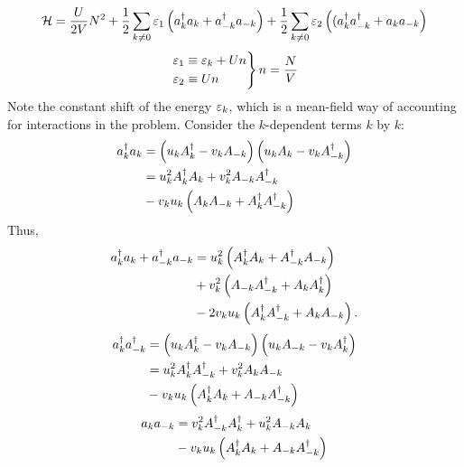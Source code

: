 \begin{equation}
	\label{eq:bose_hubbard_hamiltonian_mft}
	\mathcal{H} = \frac{U}{2V}N^2 + \frac{1}{2}\sum_{k\ne0}\varepsilon_1\left (a_{k}^{\dagger}a_{k} + a_{-k}^{\dagger}a_{-k}\right ) + \frac{1}{2}\sum_{k\ne0}\varepsilon_{2}\left ((a_{k}^{\dagger}a_{-k}^{\dagger} + a_{k}a_{-k}\right )
\end{equation}
\begin{equation}
	\begin{rcases}
		\varepsilon_1 \equiv \varepsilon_k + Un \\
		\varepsilon_2 \equiv Un
	\end{rcases}
	n = \frac{N}{V}
\end{equation}
Note the constant shift of the energy $\varepsilon_k$, which is a mean-field way of accounting for interactions in the problem. 
Consider the $k$-dependent terms $k$ by $k$:
\begin{equation}
	\begin{aligned}
		a_{k}^{\dagger}a_{k} &= \left (u_kA_k^{\dagger}-v_kA_{-k}\right )\left (u_kA_k-v_kA_{-k}^{\dagger}\right ) \\
		&= u_k^2A_{k}^{\dagger}A_{k} + v_{k}^2 A_{-k}A_{-k}^{\dagger} \\
		& - v_ku_k\left (A_{k}A_{-k} + A_{k}^{\dagger}A_{-k}^{\dagger}\right )
	\end{aligned}
\end{equation}
Thus, 
\begin{equation}
	\begin{aligned}
		a_{k}^{\dagger}a_{k} + a_{-k}^{\dagger}a_{-k} &= u_k^2\left (A_{k}^{\dagger}A_{k} +A_{-k}^{\dagger}A_{-k}\right ) \\
		& + v_{k}^2\left (A_{-k}A_{-k}^{\dagger} + A_{k}A_{k}^{\dagger}\right ) \\
		&-2v_ku_k\left (A_{k}^{\dagger}A_{-k}^{\dagger}+A_{k}A_{-k}\right ).
	\end{aligned}
\end{equation}
\begin{equation}
	\begin{aligned}
		a_{k}^{\dagger}a_{-k}^{\dagger} &= \left (u_kA_k^{\dagger}-v_kA_{-k}\right )\left (u_kA_{-k}-v_kA_{k}^{\dagger}\right ) \\
		&= u_k^2A_{k}^{\dagger}A_{-k}^{\dagger} + v_{k}^2 A_{k}A_{-k} \\
		& - v_ku_k\left (A_{k}^{\dagger}A_{k} + A_{-k}A_{-k}^{\dagger}\right )
	\end{aligned}
\end{equation}
\begin{equation}
	\begin{aligned}
		a_{k}a_{-k} &= v_k^2A_{-k}^{\dagger}A_{k}^{\dagger} + u_{k}^2 A_{-k}A_{k} \\
		& - v_ku_k\left (A_{k}^{\dagger}A_{k} + A_{-k}A_{-k}^{\dagger}\right )
	\end{aligned}
\end{equation}
